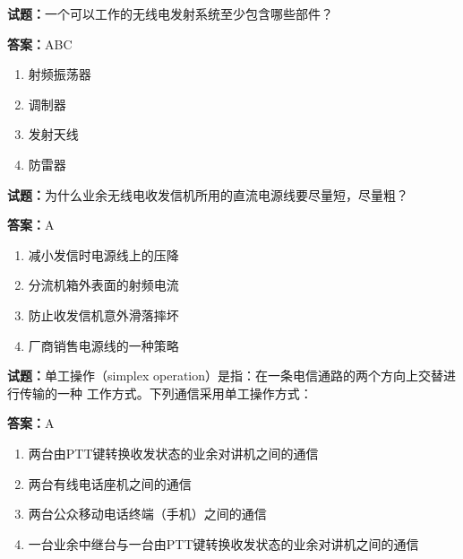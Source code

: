 \documentclass{ctexbook}
\begin{document}




\vspace{1em}

\textbf{试题：}一个可以工作的无线电发射系统至少包含哪些部件？ 

\textbf{答案：}ABC 

\begin{enumerate}[leftmargin=3em]
  \item 射频振荡器 

  \item 调制器 

  \item 发射天线 

  \item 防雷器 


\end{enumerate}





\vspace{1em}

\textbf{试题：}为什么业余无线电收发信机所用的直流电源线要尽量短，尽量粗？ 

\textbf{答案：}A 

\begin{enumerate}[leftmargin=3em]
  \item 减小发信时电源线上的压降 

  \item 分流机箱外表面的射频电流 

  \item 防止收发信机意外滑落摔坏 

  \item 厂商销售电源线的一种策略 

\end{enumerate}





\vspace{1em}

\textbf{试题：}单工操作（simplex operation）是指：在一条电信通路的两个方向上交替进行传输的一种
工作方式。下列通信采用单工操作方式： 

\textbf{答案：}A 

\begin{enumerate}[leftmargin=3em]
  \item 两台由PTT键转换收发状态的业余对讲机之间的通信 

  \item 两台有线电话座机之间的通信 

  \item 两台公众移动电话终端（手机）之间的通信 

  \item 一台业余中继台与一台由PTT键转换收发状态的业余对讲机之间的通信 

\end{enumerate}
\end{document}
